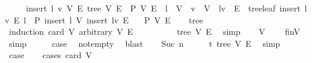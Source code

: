 \begin{isabellebody}
\ \ \ \ \ insert{\isacharcolon}{\kern0pt}\ {\isachardoublequoteopen}{\isasymAnd}l\ v\ V\ E{\isachardot}{\kern0pt}\ tree\ V\ E\ {\isasymLongrightarrow}\ P\ V\ E\ {\isasymLongrightarrow}\ l\ {\isasymnotin}\ V\ {\isasymLongrightarrow}\ v\ {\isasymin}\ V\ {\isasymLongrightarrow}\ {\isacharbraceleft}{\kern0pt}l{\isacharcomma}{\kern0pt}v{\isacharbraceright}{\kern0pt}\ {\isasymnotin}\ E\ {\isasymLongrightarrow}\ tree{\isachardot}{\kern0pt}leaf\ {\isacharparenleft}{\kern0pt}insert\ {\isacharbraceleft}{\kern0pt}l{\isacharcomma}{\kern0pt}v{\isacharbraceright}{\kern0pt}\ E{\isacharparenright}{\kern0pt}\ l\ {\isasymLongrightarrow}\ P\ {\isacharparenleft}{\kern0pt}insert\ l\ V{\isacharparenright}{\kern0pt}\ {\isacharparenleft}{\kern0pt}insert\ {\isacharbraceleft}{\kern0pt}l{\isacharcomma}{\kern0pt}v{\isacharbraceright}{\kern0pt}\ E{\isacharparenright}{\kern0pt}{\isachardoublequoteclose}\isanewline
\ \ \ {\isachardoublequoteopen}P\ V\ E{\isachardoublequoteclose}\isanewline
%
\isadelimproof
\ \ %
\endisadelimproof
%
\isatagproof
{}\isamarkupfalse%
\ tree\isanewline
{}\isamarkupfalse%
\ {\isacharparenleft}{\kern0pt}induction\ {\isachardoublequoteopen}card\ V{\isachardoublequoteclose}\ arbitrary{\isacharcolon}{\kern0pt}\ V\ E{\isacharparenright}{\kern0pt}\isanewline
\ \ \isamarkupfalse%
\ {}\isanewline
\ \ \isamarkupfalse%
\ \isamarkupfalse%
\ tree\ V\ E\ \isamarkupfalse%
\ simp\isanewline
\ \ \isamarkupfalse%
\ {\isachardoublequoteopen}V\ {\isacharequal}{\kern0pt}\ {\isacharbraceleft}{\kern0pt}{\isacharbraceright}{\kern0pt}{\isachardoublequoteclose}\ \isamarkupfalse%
\ finV\ {}{\isacharparenleft}{\kern0pt}{}{\isacharparenright}{\kern0pt}\ \isamarkupfalse%
\ simp\isanewline
\ \ \isamarkupfalse%
\ \isamarkupfalse%
\ {\isacharquery}{\kern0pt}case\ \isamarkupfalse%
\ not{\isacharunderscore}{\kern0pt}empty\ \isamarkupfalse%
\ blast\isanewline
{}\isamarkupfalse%
\isanewline
\ \ \isamarkupfalse%
\ {\isacharparenleft}{\kern0pt}Suc\ n{\isacharparenright}{\kern0pt}\isanewline
\ \ \isamarkupfalse%
\ \isamarkupfalse%
\ t{\isacharcolon}{\kern0pt}\ tree\ V\ E\ \isamarkupfalse%
\ simp\isanewline
\ \ \isamarkupfalse%
\ {\isacharquery}{\kern0pt}case\isanewline
\ \ \isamarkupfalse%
\ {\isacharparenleft}{\kern0pt}cases\ {\isachardoublequoteopen}card\ V\ {\isacharequal}{\kern0pt}\ {}{\isachardoublequoteclose}{\isacharparenright}{\kern0pt}\isanewline

\end{isabellebody}
